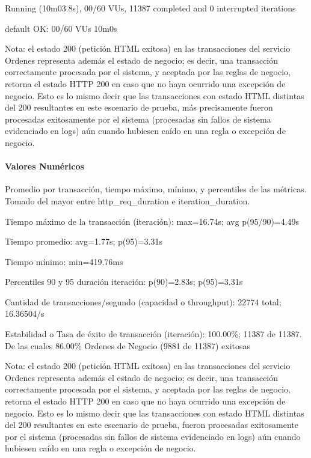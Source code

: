 \documentclass[
  paper=a4,
  ,captions=tableheading
]{scrartcl}
\renewenvironment{quote}{\begin{customblockquote}\list{}{\rightmargin=0em\leftmargin=0em}%
\item\relax\color{blockquote-text}\ignorespaces}{\unskip\unskip\endlist\end{customblockquote}}
\begin{document}
\begin{quote}
Running (10m03.8s), 00/60 VUs, 11387 completed and 0 interrupted
iterations

default OK: 00/60 VUs 10m0s
\end{quote}

Nota: el estado 200 (petición HTML exitosa) en las transacciones del
servicio Ordenes representa además el estado de negocio; es decir, una
transacción correctamente procesada por el sistema, y aceptada por las
reglas de negocio, retorna el estado HTTP 200 en caso que no haya
ocurrido una excepción de negocio. Esto es lo mismo decir que las
transacciones con estado HTML distintas del 200 resultantes en este
escenario de prueba, más precisamente fueron procesadas exitosamente por
el sistema (procesadas sin fallos de sistema evidenciado en logs) aún
cuando hubiesen caído en una regla o excepción de negocio.

\paragraph{Valores Numéricos}\label{sec:valores-numuxe9ricos-2}

Promedio por transacción, tiempo máximo, mínimo, y percentiles de las
métricas. Tomado del mayor entre http\_req\_duration e
iteration\_duration.

\begin{quote}
Tiempo máximo de la transacción (iteración): max=16.74s; avg
p(95/90)=4.49s

Tiempo promedio: avg=1.77s; p(95)=3.31s

Tiempo mínimo: min=419.76ms

Percentiles 90 y 95 duración iteración: p(90)=2.83s; p(95)=3.31s

Cantidad de transacciones/segundo (capacidad o throughput): 22774 total;
16.36504/s

Estabilidad o Tasa de éxito de transacción (iteración): 100.00\%; 11387
de 11387. De las cuales 86.00\% Ordenes de Negocio (9881 de 11387)
exitosas
\end{quote}

Nota: el estado 200 (petición HTML exitosa) en las transacciones del
servicio Ordenes representa además el estado de negocio; es decir, una
transacción correctamente procesada por el sistema, y aceptada por las
reglas de negocio, retorna el estado HTTP 200 en caso que no haya
ocurrido una excepción de negocio. Esto es lo mismo decir que las
transacciones con estado HTML distintas del 200 resultantes en este
escenario de prueba, fueron procesadas exitosamente por el sistema
(procesadas sin fallos de sistema evidenciado en logs) aún cuando
hubiesen caído en una regla o excepción de negocio.
\end{document}

